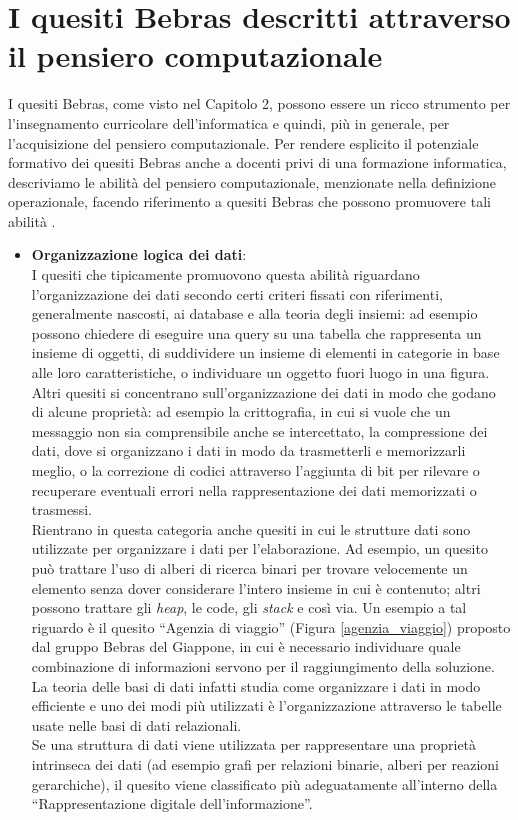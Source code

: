 \documentclass[12pt]{report}
\begin{document}
\section{I quesiti Bebras descritti attraverso il pensiero computazionale} \label{ClassCT}
I quesiti Bebras, come visto nel Capitolo 2, possono essere un ricco strumento per l'insegnamento curricolare dell'informatica e quindi, più in generale, per l'acquisizione del pensiero computazionale.
Per rendere esplicito il potenziale formativo dei quesiti Bebras anche a docenti privi di una formazione informatica, descriviamo le abilità del pensiero computazionale, menzionate nella definizione operazionale, facendo riferimento a quesiti Bebras che possono promuovere tali abilità \cite{LonatiISSEP2017}.

\begin{itemize}
	\item \textbf{Organizzazione logica dei dati}: 
	\\
	I quesiti che tipicamente promuovono questa abilità riguardano l'organizzazione dei dati secondo certi criteri fissati con riferimenti, generalmente nascosti, ai database e alla teoria degli insiemi: ad esempio possono chiedere di eseguire una query su una tabella che rappresenta un insieme di oggetti, di suddividere un insieme di elementi in categorie in base alle loro caratteristiche, o individuare un oggetto fuori luogo in una figura.
	\\
	Altri quesiti si concentrano sull'organizzazione dei dati in modo che godano di alcune proprietà: ad esempio la crittografia, in cui si vuole che un messaggio non sia comprensibile anche se intercettato, la compressione dei dati, dove si organizzano i dati in modo da trasmetterli e memorizzarli meglio, o la correzione di codici attraverso l'aggiunta di bit per rilevare o recuperare eventuali errori nella rappresentazione dei dati memorizzati o trasmessi.
	\\
	Rientrano in questa categoria anche quesiti in cui le strutture dati sono utilizzate per organizzare i dati per l'elaborazione. Ad esempio, un quesito può trattare l'uso di alberi di ricerca binari per trovare velocemente un elemento senza dover considerare l'intero insieme in cui è contenuto; altri possono trattare gli \textit{heap}, le code, gli \textit{stack} e così via. 
	Un esempio a tal riguardo è il quesito ``Agenzia di viaggio'' (Figura \ref{agenzia_viaggio}) proposto dal gruppo Bebras del Giappone, in cui è necessario individuare quale combinazione di informazioni servono per il raggiungimento della soluzione. La teoria delle basi di dati infatti studia come organizzare i dati in modo efficiente e uno dei modi più utilizzati è l'organizzazione attraverso le tabelle usate nelle basi di dati relazionali.
	\\
	Se una struttura di dati viene utilizzata per rappresentare una proprietà intrinseca dei dati (ad esempio grafi per relazioni binarie, alberi per reazioni gerarchiche), il quesito viene classificato più adeguatamente all'interno della ``Rappresentazione digitale dell'informazione''.
	

\end{itemize}
\end{document}
